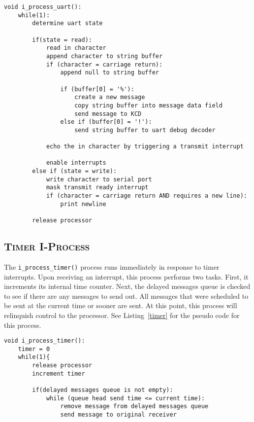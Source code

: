 \documentclass[oneside]{report}
\begin{document}
\begin{lstlisting}
void i_process_uart():
    while(1):
        determine uart state

        if(state = read):
            read in character
            append character to string buffer
            if (character = carriage return):
                append null to string buffer            

                if (buffer[0] = '%'):
                    create a new message
                    copy string buffer into message data field
                    send message to KCD
                else if (buffer[0] = '!'):
                    send string buffer to uart debug decoder

            echo the in character by triggering a transmit interrupt

            enable interrupts
        else if (state = write):
            write character to serial port
            mask transmit ready interrupt
            if (character = carriage return AND requires a new line):
                print newline
            
        release processor
\end{lstlisting}

\subsection{\textsc{Timer I-Process}}
The \texttt{i\_process\_timer()} process runs immediately in response
to timer interrupts. Upon receiving an interrupt, this process
performs two tasks. First, it increments its internal time
counter. Next, the delayed messages queue is checked to see if there
are any messages to send out. All messages that were scheduled to be
sent at the current time or sooner are sent. At this point, this
process will relinquish control to the processor. See
Listing~\ref{timer} for the pseudo code for this process.

\begin{lstlisting}
void i_process_timer():
    timer = 0
    while(1){
        release processor
        increment timer

        if(delayed messages queue is not empty):
            while (queue head send time <= current time):
                remove message from delayed messages queue
                send message to original receiver
\end{lstlisting}
\end{document}
